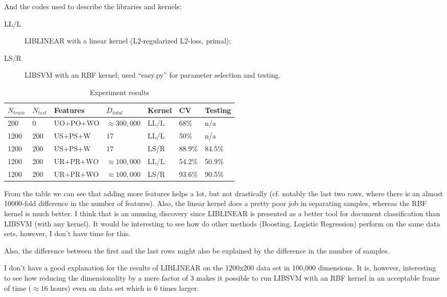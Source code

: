\documentclass{article}
\begin{document}
And the codes used to describe the libraries and kernels:
\begin{description}
  \item[LL/L] LIBLINEAR with a linear kernel (L2-regularized L2-loss,
    primal);

  \item[LS/R] LIBSVM with an RBF kernel; used ``easy.py'' for
    parameter selection and testing.
\end{description}

\begin{table*}[ht]
  \centering
  \begin{tabular}[h]{||l|l|l|l|l|l|l||}
    \hline
    $N_{train}$ & $N_{test}$ & Features & $D_{total}$ & Kernel & CV & Testing \\
    \hline\hline
    200 & 0 & UO+PO+WO & $\approx 300,000$  & LL/L & 68\%   & n/a \\
    \hline
    1200 & 200 & US+PS+W & $17$   & LL/L & 50\% & n/a \\
    \hline
    1200 & 200 & US+PS+W & $17$  & LS/R & 88.9\% & 84.5\% \\
    \hline
    1200 & 200 & UR+PR+WO & $\approx 100,000$ & LL/L & 54.2\% & 50.9\% \\
    \hline
    1200 & 200 & UR+PR+WO & $\approx 100,000$ & LS/R & 93.6\% & 90.5\% \\
    \hline
  \end{tabular}  
  \caption{Experiment results}
  \label{tab:results}
\end{table*}

From the table we can see that adding more features helps a lot, but
not drastically (cf. notably the last two rows, where there is an
almost 10000-fold difference in the number of features). Also, the
linear kernel does a pretty poor job in separating samples, whereas
the RBF kernel is much better. I think that is an amusing discovery
since LIBLINEAR is presented as a better tool for document
classification than LIBSVM (with any kernel). It would be interesting
to see how do other methods (Boosting, Logistic Regression) perform on
the same data sets, however, I don't have time for this.

Also, the difference between the first and the last rows might also be
explained by the difference in the number of samples.

I don't have a good explanation for the results of LIBLINEAR on the
1200x200 data set in 100,000 dimensions. It is, however, interesting to
see how reducing the dimensionality by a mere factor of 3 makes it
possible to run LIBSVM with an RBF kernel in an acceptable frame of
time ($\approx 16$ hours) even on data set which is 6 times larger.
\end{document}
